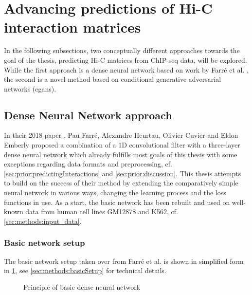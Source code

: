 \section{Advancing predictions of Hi-C interaction matrices}
In the following subsections, two conceptually different approaches towards the goal of the thesis,
predicting Hi-C matrices from ChIP-seq data, will be explored.
While the first approach is a dense neural network based on work by Farr\'e et al. \cite{Farre2018a},
the second is a novel method based on conditional generative adversarial networks (\acrshort{cgan}s).

\subsection{Dense Neural Network approach}\label{sec:improve:DNNapproach}
In their 2018 paper \cite{Farre2018a}, Pau Farr\'e, Alexandre Heurtau, Olivier Cuvier and Eldon Emberly
proposed a combination of a 1D convolutional filter with a three-layer dense neural network 
which already fulfills most goals of this thesis with some exceptions regarding data formats and preprocessing, 
cf. \cref{sec:prior:predictingInteractions} and \ref{sec:prior:discussion}.
This thesis attempts to build on the success of their method by extending the comparatively simple neural network
in various ways, changing the learning process and the loss functions in use.
As a start, the basic network has been rebuilt and used on well-known data from human cell lines GM12878 and K562, cf. \cref{sec:methods:input_data}.

\subsubsection{Basic network setup} \label{sec:improve:basicNetwork}
The basic network setup taken over from Farr\'e et al. \cite{Farre2018a} is shown in simplified form in \cref{fig:improve:priciple_basic_dnn},
see \cref{sec:methods:basicSetup} for technical details.
\begin{figure}[hbp]
    \small
    \centering
    \caption{Principle of basic dense neural network}
    \label{fig:improve:priciple_basic_dnn}
\end{figure}

